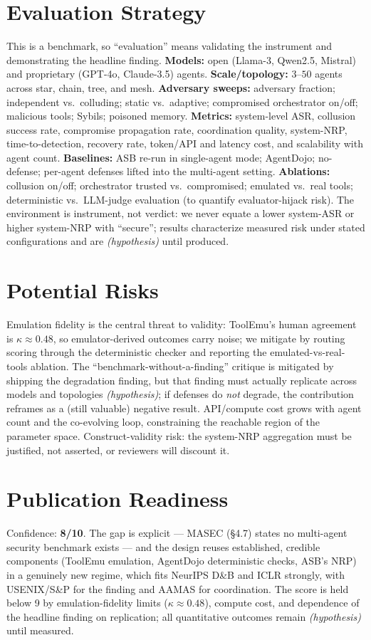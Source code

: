 \documentclass[11pt]{article}
\newcommand{\hyp}{\textit{(hypothesis)}\xspace}
\begin{document}
\section*{Evaluation Strategy}
This is a benchmark, so ``evaluation'' means validating the instrument and demonstrating the headline finding. \textbf{Models:} open (Llama-3, Qwen2.5, Mistral) and proprietary (GPT-4o, Claude-3.5) agents. \textbf{Scale/topology:} $3$--$50$ agents across star, chain, tree, and mesh. \textbf{Adversary sweeps:} adversary fraction; independent vs.\ colluding; static vs.\ adaptive; compromised orchestrator on/off; malicious tools; Sybils; poisoned memory. \textbf{Metrics:} system-level ASR, collusion success rate, compromise propagation rate, coordination quality, system-NRP, time-to-detection, recovery rate, token/API and latency cost, and scalability with agent count. \textbf{Baselines:} ASB re-run in single-agent mode; AgentDojo; no-defense; per-agent defenses lifted into the multi-agent setting. \textbf{Ablations:} collusion on/off; orchestrator trusted vs.\ compromised; emulated vs.\ real tools; deterministic vs.\ LLM-judge evaluation (to quantify evaluator-hijack risk). The environment is instrument, not verdict: we never equate a lower system-ASR or higher system-NRP with ``secure''; results characterize measured risk under stated configurations and are \hyp until produced.

\section*{Potential Risks}
Emulation fidelity is the central threat to validity: ToolEmu's human agreement is $\kappa \approx 0.48$, so emulator-derived outcomes carry noise; we mitigate by routing scoring through the deterministic checker and reporting the emulated-vs-real-tools ablation. The ``benchmark-without-a-finding'' critique is mitigated by shipping the degradation finding, but that finding must actually replicate across models and topologies \hyp; if defenses do \emph{not} degrade, the contribution reframes as a (still valuable) negative result. API/compute cost grows with agent count and the co-evolving loop, constraining the reachable region of the parameter space. Construct-validity risk: the system-NRP aggregation must be justified, not asserted, or reviewers will discount it.

\section*{Publication Readiness}
Confidence: \textbf{8/10}. The gap is explicit --- MASEC (\S4.7) states no multi-agent security benchmark exists --- and the design reuses established, credible components (ToolEmu emulation, AgentDojo deterministic checks, ASB's NRP) in a genuinely new regime, which fits NeurIPS D\&B and ICLR strongly, with USENIX/S\&P for the finding and AAMAS for coordination. The score is held below 9 by emulation-fidelity limits ($\kappa \approx 0.48$), compute cost, and dependence of the headline finding on replication; all quantitative outcomes remain \hyp until measured.
\end{document}
